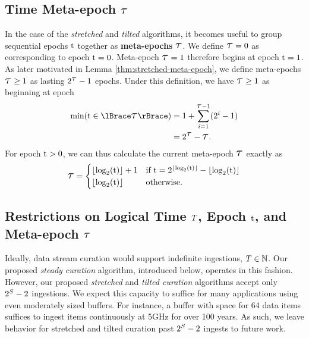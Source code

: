 \subsection{Time Meta-epoch $\colortau$}
\label{sec:notation-metaepoch}

In the case of the \textit{stretched} and \textit{tilted} algorithms, it becomes useful to group sequential epochs $\colort$ together as \textbf{meta-epochs} $\colortau$.
We define $\colortau=0$ as corresponding to epoch $\colort=0$.
Meta-epoch $\colortau=1$ therefore begins at epoch $\colort = 1$.
As later motivated in Lemma \ref{thm:stretched-meta-epoch}, we define meta-epochs $\colortau\geq1$ as lasting $2^{\colortau} - 1$ epochs.
Under this definition, we have $\colortau\geq1$ as beginning at epoch
\begin{align}
\min(\colort \in \colortausetoft)
&= 1 + \sum_{i=1}^{\colortau - 1} (2^{i} - 1) \nonumber \\
&= 2^{\colortau} - \colortau.
\label{eqn:meta-epoch-defn}
\end{align}
For epoch $\colort > 0$, we can thus calculate the current meta-epoch $\colortau$ exactly as
\begin{align*}
\colortau
=
\begin{cases}
\left\lfloor \log_2(\colort) \right\rfloor + 1 & \text{if } \colort = 2^{\left\lfloor \log_2(\colort) \right\rfloor} - \left\lfloor \log_2(\colort) \right\rfloor \\
\left\lfloor \log_2(\colort) \right\rfloor & \text{otherwise.}
\end{cases}
\end{align*}

\subsection{Restrictions on Logical Time $\colorT$, Epoch $\colort$, and Meta-epoch $\colortau$}

Ideally, data stream curation would support indefinite ingestions, $\colorT \in \mathbb{N}$.
Our proposed \textit{steady curation} algorithm, introduced below, operates in this fashion.
However, our proposed \textit{stretched} and \textit{tilted curation} algorithms accept only $2^{\colorS} - 2$ ingestions.
We expect this capacity to suffice for many applications using even moderately sized buffers.
For instance, a buffer with space for 64 data items suffices to ingest items continuously at 5GHz for over 100 years.
As such, we leave behavior for stretched and tilted curation past $2^{\colorS} - 2$ ingests to future work.

